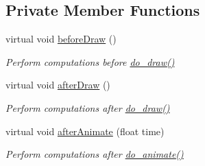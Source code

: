 \subsection*{Private Member Functions}
\begin{DoxyCompactItemize}
\item 
virtual void \hyperlink{classHierarchicalRenderable_aedbaa13858872d5dcd7ce644da9a66e1}{before\+Draw} ()
\begin{DoxyCompactList}\small\item\em Perform computations before \hyperlink{classRenderable_a98ab6308c1d2b56dacda7c435fb38d5b}{do\+\_\+draw()} \end{DoxyCompactList}\item 
virtual void \hyperlink{classHierarchicalRenderable_a50fa8b46938a3da839829523838ddf2c}{after\+Draw} ()
\begin{DoxyCompactList}\small\item\em Perform computations after \hyperlink{classRenderable_a98ab6308c1d2b56dacda7c435fb38d5b}{do\+\_\+draw()} \end{DoxyCompactList}\item 
virtual void \hyperlink{classHierarchicalRenderable_a8de5020d6678c97050079150bcb131fa}{after\+Animate} (float time)
\begin{DoxyCompactList}\small\item\em Perform computations after \hyperlink{classRenderable_aa5206322555c9dece40b21e797629b34}{do\+\_\+animate()} \end{DoxyCompactList}\end{DoxyCompactItemize}
